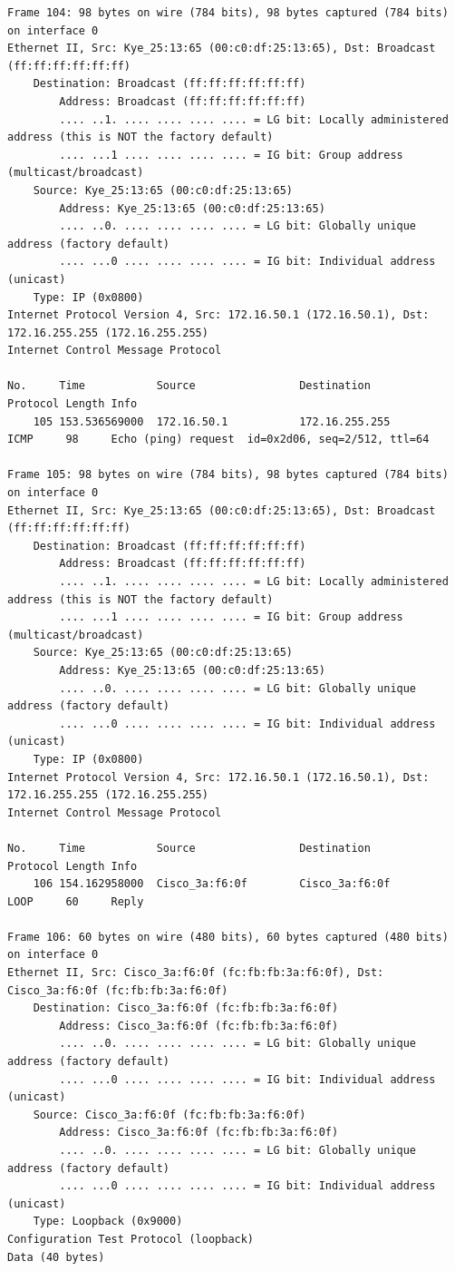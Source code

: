\documentclass[a4paper,11pt]{article}
\begin{document}
\begin{lstlisting}
Frame 104: 98 bytes on wire (784 bits), 98 bytes captured (784 bits) on interface 0
Ethernet II, Src: Kye_25:13:65 (00:c0:df:25:13:65), Dst: Broadcast (ff:ff:ff:ff:ff:ff)
    Destination: Broadcast (ff:ff:ff:ff:ff:ff)
        Address: Broadcast (ff:ff:ff:ff:ff:ff)
        .... ..1. .... .... .... .... = LG bit: Locally administered address (this is NOT the factory default)
        .... ...1 .... .... .... .... = IG bit: Group address (multicast/broadcast)
    Source: Kye_25:13:65 (00:c0:df:25:13:65)
        Address: Kye_25:13:65 (00:c0:df:25:13:65)
        .... ..0. .... .... .... .... = LG bit: Globally unique address (factory default)
        .... ...0 .... .... .... .... = IG bit: Individual address (unicast)
    Type: IP (0x0800)
Internet Protocol Version 4, Src: 172.16.50.1 (172.16.50.1), Dst: 172.16.255.255 (172.16.255.255)
Internet Control Message Protocol

No.     Time           Source                Destination           Protocol Length Info
    105 153.536569000  172.16.50.1           172.16.255.255        ICMP     98     Echo (ping) request  id=0x2d06, seq=2/512, ttl=64

Frame 105: 98 bytes on wire (784 bits), 98 bytes captured (784 bits) on interface 0
Ethernet II, Src: Kye_25:13:65 (00:c0:df:25:13:65), Dst: Broadcast (ff:ff:ff:ff:ff:ff)
    Destination: Broadcast (ff:ff:ff:ff:ff:ff)
        Address: Broadcast (ff:ff:ff:ff:ff:ff)
        .... ..1. .... .... .... .... = LG bit: Locally administered address (this is NOT the factory default)
        .... ...1 .... .... .... .... = IG bit: Group address (multicast/broadcast)
    Source: Kye_25:13:65 (00:c0:df:25:13:65)
        Address: Kye_25:13:65 (00:c0:df:25:13:65)
        .... ..0. .... .... .... .... = LG bit: Globally unique address (factory default)
        .... ...0 .... .... .... .... = IG bit: Individual address (unicast)
    Type: IP (0x0800)
Internet Protocol Version 4, Src: 172.16.50.1 (172.16.50.1), Dst: 172.16.255.255 (172.16.255.255)
Internet Control Message Protocol

No.     Time           Source                Destination           Protocol Length Info
    106 154.162958000  Cisco_3a:f6:0f        Cisco_3a:f6:0f        LOOP     60     Reply

Frame 106: 60 bytes on wire (480 bits), 60 bytes captured (480 bits) on interface 0
Ethernet II, Src: Cisco_3a:f6:0f (fc:fb:fb:3a:f6:0f), Dst: Cisco_3a:f6:0f (fc:fb:fb:3a:f6:0f)
    Destination: Cisco_3a:f6:0f (fc:fb:fb:3a:f6:0f)
        Address: Cisco_3a:f6:0f (fc:fb:fb:3a:f6:0f)
        .... ..0. .... .... .... .... = LG bit: Globally unique address (factory default)
        .... ...0 .... .... .... .... = IG bit: Individual address (unicast)
    Source: Cisco_3a:f6:0f (fc:fb:fb:3a:f6:0f)
        Address: Cisco_3a:f6:0f (fc:fb:fb:3a:f6:0f)
        .... ..0. .... .... .... .... = LG bit: Globally unique address (factory default)
        .... ...0 .... .... .... .... = IG bit: Individual address (unicast)
    Type: Loopback (0x9000)
Configuration Test Protocol (loopback)
Data (40 bytes)


\end{lstlisting}
\end{document}
